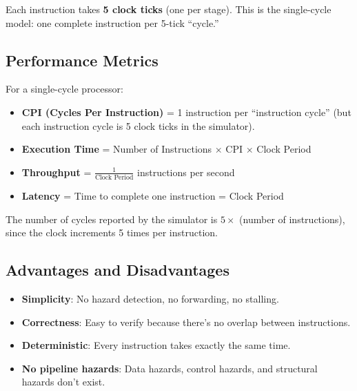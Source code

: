 \documentclass[12pt,a4paper]{article}
\begin{document}
Each instruction takes \textbf{5 clock ticks} (one per stage). This is the single-cycle model: one complete instruction per 5-tick ``cycle.''

\subsection{Performance Metrics}

For a single-cycle processor:

\begin{itemize}
    \item \textbf{CPI (Cycles Per Instruction)} = 1 instruction per ``instruction cycle'' (but each instruction cycle is 5 clock ticks in the simulator).
    \item \textbf{Execution Time} = Number of Instructions $\times$ CPI $\times$ Clock Period
    \item \textbf{Throughput} = $\frac{1}{\text{Clock Period}}$ instructions per second
    \item \textbf{Latency} = Time to complete one instruction = Clock Period
\end{itemize}

The number of cycles reported by the simulator is $5 \times$ (number of instructions), since the clock increments 5 times per instruction.

\subsection{Advantages and Disadvantages}

\begin{tcolorbox}[colback=green!5, colframe=green!50!black, title=Advantages of Single-Cycle Design]
\begin{itemize}
    \item \textbf{Simplicity}: No hazard detection, no forwarding, no stalling.
    \item \textbf{Correctness}: Easy to verify because there's no overlap between instructions.
    \item \textbf{Deterministic}: Every instruction takes exactly the same time.
    \item \textbf{No pipeline hazards}: Data hazards, control hazards, and structural hazards don't exist.
\end{itemize}
\end{tcolorbox}
\end{document}
